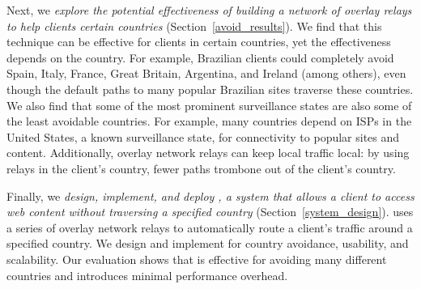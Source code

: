 Next, we {\em explore the
potential effectiveness of building a network of overlay relays to help
clients certain countries}  (Section~\ref{avoid_results}).  
We find that this technique can be effective
for clients in certain countries, yet the effectiveness depends on the
country.  For example, Brazilian clients could completely avoid Spain,
Italy, France, Great Britain, Argentina, and Ireland (among others),
even though the default paths to many popular Brazilian sites traverse
these countries. We also find that some of the most prominent
surveillance states are also some of the least avoidable countries.  For
example, many countries depend on ISPs in the United States, a known
surveillance state, for connectivity to popular sites and content.
Additionally, overlay network relays can keep local traffic local: by
using relays in the client's country, fewer paths trombone out of the
client's country.

Finally, we {\em design, implement, and deploy \system{}, a system that allows
a client to access web content without traversing a specified country}
(Section~\ref{system_design}).  \system{} uses a series of overlay
network relays to automatically route a client's traffic around a
specified country.  We design and implement \system{} for country
avoidance, usability, and scalability.  Our evaluation shows that 
\system{} is effective for avoiding many different countries and
introduces minimal performance overhead.
